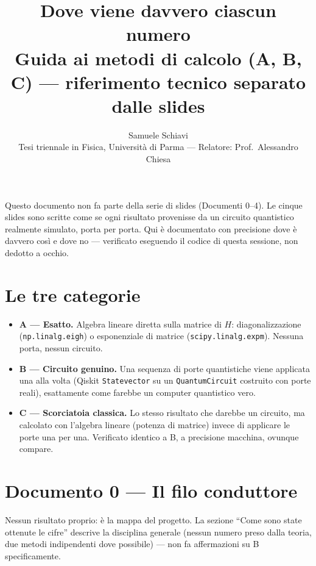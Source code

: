 \documentclass[11pt,a4paper]{article}
\title{\bfseries Dove viene davvero ciascun numero\\[2pt]
\large Guida ai metodi di calcolo (A, B, C) --- riferimento tecnico separato dalle slides}
\author{Samuele Schiavi \\ \small Tesi triennale in Fisica, Università di Parma
--- Relatore: Prof.\ Alessandro Chiesa}
\date{}
\begin{document}
\maketitle
\thispagestyle{fancy}

Questo documento non fa parte della serie di slides (Documenti 0--4). Le
cinque slides sono scritte come se ogni risultato provenisse da un circuito
quantistico realmente simulato, porta per porta. Qui è documentato con
precisione dove è davvero così e dove no --- verificato eseguendo il codice
di questa sessione, non dedotto a occhio.

\section{Le tre categorie}

\begin{itemize}[leftmargin=1.5em,itemsep=4pt]
\item \textbf{A --- Esatto.} Algebra lineare diretta sulla matrice di $H$:
diagonalizzazione (\texttt{np.linalg.eigh}) o esponenziale di matrice
(\texttt{scipy.linalg.expm}). Nessuna porta, nessun circuito.
\item \textbf{B --- Circuito genuino.} Una sequenza di porte quantistiche
viene applicata una alla volta (Qiskit \texttt{Statevector} su un
\texttt{QuantumCircuit} costruito con porte reali), esattamente come farebbe
un computer quantistico vero.
\item \textbf{C --- Scorciatoia classica.} Lo stesso risultato che darebbe un
circuito, ma calcolato con l'algebra lineare (potenza di matrice) invece di
applicare le porte una per una. Verificato identico a B, a precisione
macchina, ovunque compare.
\end{itemize}


\section{Documento 0 --- Il filo conduttore}

Nessun risultato proprio: è la mappa del progetto. La sezione ``Come sono
state ottenute le cifre'' descrive la disciplina generale (nessun numero
preso dalla teoria, due metodi indipendenti dove possibile) --- non fa
affermazioni su B specificamente.
\end{document}
